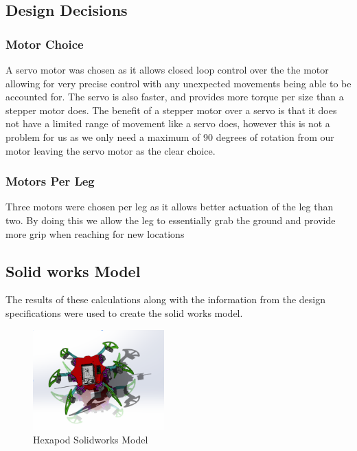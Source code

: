  




\subsection{Design Decisions}
\subsubsection{Motor Choice}
A servo motor was chosen as it allows closed loop control over the the motor allowing for very precise control with any unexpected movements being able to be accounted for. The servo is also faster, and provides more torque per size than a stepper motor does. The benefit of a stepper motor over a servo is that it does not have a limited range of movement like a servo does, however this is not a problem for us as we only need a maximum of 90 degrees of rotation from our motor leaving the servo motor as the clear choice.

\subsubsection{Motors Per Leg}
Three motors were chosen per leg as it allows better actuation of the leg than two. By doing this we allow the leg to essentially grab the ground and provide more grip when reaching for new locations

\subsection{Solid works Model}
The results of these calculations along with the information from the design specifications were used to create the solid works model.

\begin{figure}[h]
 \centering
   \includegraphics[width = 0.45\textwidth]{figures/3.png}                \caption{Hexapod Solidworks Model}
   \label{fig:Physical Model }
\end{figure}

